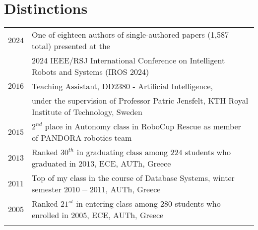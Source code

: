 \documentclass[a4paper,10pt,twoside]{article}
\begin{document}
\section{Distinctions}
\begin{tabular}{rl}

$2024$ & One of eighteen authors of single-authored papers (1,587 total) presented at the \\ &
         2024 IEEE/RSJ International Conference on Intelligent Robots and Systems (IROS 2024) \\


$2016$ & Teaching Assistant, DD2380 - Artificial Intelligence, \\ & under the
supervision of Professor Patric Jensfelt, KTH Royal Institute of Technology, Sweden \\


$2015$ & $2^{nd}$ place in Autonomy class in RoboCup Rescue as member of PANDORA robotics team \\


$2013$ & Ranked $30^{th}$ in graduating class among $224$ students who graduated in $2013$, ECE, AUTh, Greece \\


$2011$ & Top of my class in the course of Database Systems, winter semester $2010 - 2011$,
AUTh, Greece \\


$2005$ & Ranked $21^{st}$ in entering class among $280$ students who enrolled in $2005$, ECE, AUTh, Greece\\
&\\
\end{tabular}




\end{document}
